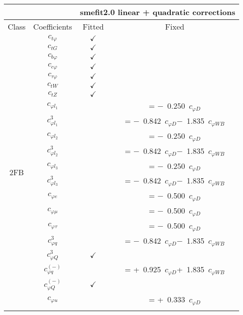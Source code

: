 \documentclass{article}
\begin{document}
\begin{table}[H]
\centering
\begin{tabular}{|c|c|c|c|}
\hline
 &  & \multicolumn{2}{c|}{smefit2.0 linear + quadratic corrections} \\ \hline
Class & Coefficients & Fitted & Fixed  \\ \hline
\multirow{24}{*}{2FB}
 & $c_{t \varphi}$ & $\checkmark$ & \\ \cline{2-4}
 & $c_{tG}$ & $\checkmark$ & \\ \cline{2-4}
 & $c_{b \varphi}$ & $\checkmark$ & \\ \cline{2-4}
 & $c_{c \varphi}$ & $\checkmark$ & \\ \cline{2-4}
 & $c_{\tau \varphi}$ & $\checkmark$ & \\ \cline{2-4}
 & $c_{tW}$ & $\checkmark$ & \\ \cline{2-4}
 & $c_{tZ}$ & $\checkmark$ & \\ \cline{2-4}
 & $c_{\varphi l_1}$ & & = $-$\ 0.250\ $c_{\varphi D}$\\ \cline{2-4}
 & $c_{\varphi l_1}^{3}$ & & = $-$\ 0.842\ $c_{\varphi D}$$-$\ 1.835\ $c_{\varphi WB}$\\ \cline{2-4}
 & $c_{\varphi l_2}$ & & = $-$\ 0.250\ $c_{\varphi D}$\\ \cline{2-4}
 & $c_{\varphi l_2}^{3}$ & & = $-$\ 0.842\ $c_{\varphi D}$$-$\ 1.835\ $c_{\varphi WB}$\\ \cline{2-4}
 & $c_{\varphi l_3}$ & & = $-$\ 0.250\ $c_{\varphi D}$\\ \cline{2-4}
 & $c_{\varphi l_3}^{3}$ & & = $-$\ 0.842\ $c_{\varphi D}$$-$\ 1.835\ $c_{\varphi WB}$\\ \cline{2-4}
 & $c_{\varphi e}$ & & = $-$\ 0.500\ $c_{\varphi D}$\\ \cline{2-4}
 & $c_{\varphi \mu}$ & & = $-$\ 0.500\ $c_{\varphi D}$\\ \cline{2-4}
 & $c_{\varphi \tau}$ & & = $-$\ 0.500\ $c_{\varphi D}$\\ \cline{2-4}
 & $c_{\varphi q}^{3}$ & & = $-$\ 0.842\ $c_{\varphi D}$$-$\ 1.835\ $c_{\varphi WB}$\\ \cline{2-4}
 & $c_{\varphi Q}^{3}$ & $\checkmark$ & \\ \cline{2-4}
 & $c_{\varphi q}^{(-)}$ & & = +\ 0.925\ $c_{\varphi D}$+\ 1.835\ $c_{\varphi WB}$\\ \cline{2-4}
 & $c_{\varphi Q}^{(-)}$ & $\checkmark$ & \\ \cline{2-4}
 & $c_{\varphi u}$ & & = +\ 0.333\ $c_{\varphi D}$\\ \cline{2-4}

\end{tabular}
\end{table}
\end{document}
